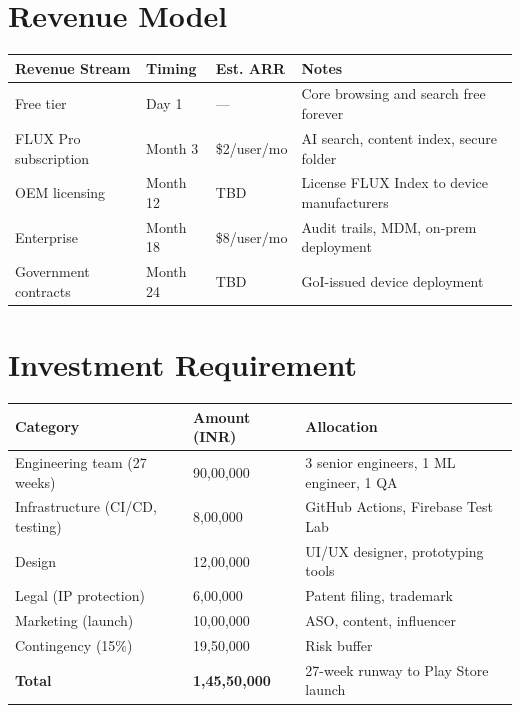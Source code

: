 \section{Revenue Model}

\begin{longtable}{@{}p{40mm}p{28mm}p{25mm}p{45mm}@{}}
\toprule
\textbf{Revenue Stream} & \textbf{Timing} & \textbf{Est. ARR} & \textbf{Notes} \\
\midrule
Free tier & Day 1 & --- & Core browsing and search free forever \\
FLUX Pro subscription & Month 3 & \$2/user/mo & AI search, content index, secure folder \\
OEM licensing & Month 12 & TBD & License FLUX Index to device manufacturers \\
Enterprise & Month 18 & \$8/user/mo & Audit trails, MDM, on-prem deployment \\
Government contracts & Month 24 & TBD & GoI-issued device deployment \\
\bottomrule
\end{longtable}

\section{Investment Requirement}

\begin{longtable}{@{}p{46mm}p{30mm}p{64mm}@{}}
\toprule
\textbf{Category} & \textbf{Amount (INR)} & \textbf{Allocation} \\
\midrule
Engineering team (27 weeks) & 90,00,000 & 3 senior engineers, 1 ML engineer, 1 QA \\
Infrastructure (CI/CD, testing) & 8,00,000 & GitHub Actions, Firebase Test Lab \\
Design & 12,00,000 & UI/UX designer, prototyping tools \\
Legal (IP protection) & 6,00,000 & Patent filing, trademark \\
Marketing (launch) & 10,00,000 & ASO, content, influencer \\
Contingency (15\%) & 19,50,000 & Risk buffer \\
\midrule
\textbf{Total} & \textbf{1,45,50,000} & 27-week runway to Play Store launch \\
\bottomrule
\end{longtable}
